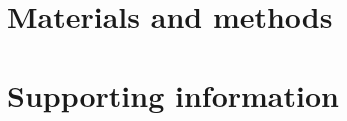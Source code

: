 \documentclass[10pt,letterpaper]{article}
\theoremstyle{plain}
\theoremstyle{remark}
\begin{document}
\section*{Materials and methods}

\section*{Supporting information}



\end{document}
